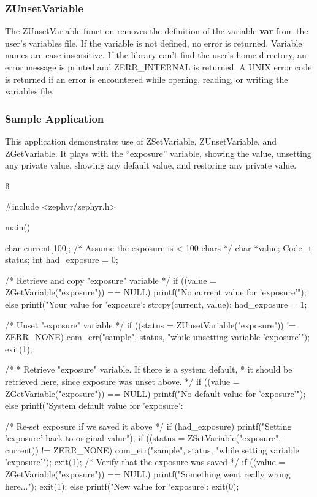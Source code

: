 \subsubsection{ZUnsetVariable}
\label{ZUnsetVariable}

\etemplate
{}

The ZUnsetVariable function removes the definition of the variable
{\bf var} from the user's variables file.  If the variable is
not defined, no error is returned.  Variable names are case
insensitive.  If the library can't find the user's home directory, an
error message is printed and ZERR_INTERNAL is returned.  A UNIX error
code is returned if an error is encountered while opening, reading, or
writing the variables file.

\subsubsection{Sample Application}
\label{variables-application}

This application demonstrates use of ZSetVariable, ZUnsetVariable, and
ZGetVariable.  It plays with the ``exposure'' variable, showing
the value, unsetting any private value, showing any default value, and
restoring any private value.

\ss
\begin{code}
#include <zephyr/zephyr.h>

main()
{
    char current[100];           /* Assume the exposure is < 100 chars */
    char *value;
    Code_t status;
    int had_exposure = 0;

    /* Retrieve and copy "exposure" variable */
    if ((value = ZGetVariable("exposure")) == NULL)
        printf("No current value for 'exposure'\n");
    else {
        printf("Your value for 'exposure': %
        strcpy(current, value);
        had_exposure = 1;
    }

    /* Unset "exposure" variable */
    if ((status = ZUnsetVariable("exposure")) != ZERR_NONE) {
        com_err("sample", status,
                "while unsetting variable 'exposure'");
        exit(1);
    }

    /* 
     * Retrieve "exposure" variable.  If there is a system default,
     * it should be retrieved here, since exposure was unset above.
     */
    if ((value = ZGetVariable("exposure")) == NULL)
        printf("No default value for 'exposure'\n");
    else
        printf("System default value for 'exposure': %

    /* Re-set exposure if we saved it above */
    if (had_exposure) {
        printf("Setting 'exposure' back to original value\n");
        if ((status = ZSetVariable("exposure", current)) !=
            ZERR_NONE) {
            com_err("sample", status,
                    "while setting variable 'exposure'");
            exit(1);
        }
        /* Verify that the exposure was saved */
        if ((value = ZGetVariable("exposure")) == NULL) {
            printf("Something went really wrong here...\n");
            exit(1);
        } else
            printf("New value for 'exposure': %
    }
    exit(0);
}
\end{code}
\ess
